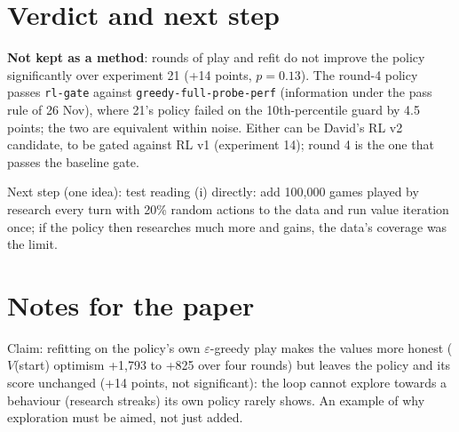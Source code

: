\documentclass{../polyexp}
\begin{document}
\section{Verdict and next step}
\textbf{Not kept as a method}: rounds of play and refit do not improve the policy significantly over experiment 21
(+14 points, $p = 0.13$). The round-4 policy passes \texttt{rl-gate} against \texttt{greedy-full-probe-perf}
(information under the pass rule of 26 Nov), where 21's policy failed on the 10th-percentile guard by 4.5 points;
the two are equivalent within noise. Either can be David's RL v2 candidate, to be gated against RL v1 (experiment
14); round 4 is the one that passes the baseline gate.

Next step (one idea): test reading (i) directly: add 100{,}000 games played by research every turn with 20\%
random actions to the data and run value iteration once; if the policy then researches much more and gains, the
data's coverage was the limit.

\section{Notes for the paper}
Claim: refitting on the policy's own $\varepsilon$-greedy play makes the values more honest ($V$(start) optimism
+1{,}793 to +825 over four rounds) but leaves the policy and its score unchanged (+14 points, not significant): the
loop cannot explore towards a behaviour (research streaks) its own policy rarely shows. An example of why
exploration must be aimed, not just added.

\end{document}
